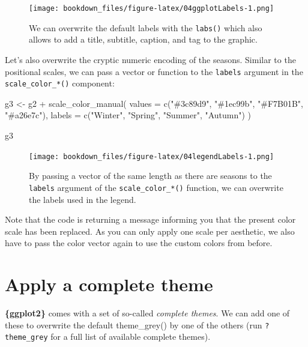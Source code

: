 \documentclass[
]{krantz}
\makeatletter
\newenvironment{Shaded}{\begin{snugshade}}{\end{snugshade}}
\newcommand{\AttributeTok}[1]{\textcolor[rgb]{0.61,0.61,0.61}{#1}}
\newcommand{\FunctionTok}[1]{\textcolor[rgb]{0,0,0}{#1}}
\newcommand{\NormalTok}[1]{#1}
\newcommand{\OtherTok}[1]{\textcolor[rgb]{0.37,0.37,0.37}{#1}}
\newcommand{\SpecialCharTok}[1]{\textcolor[rgb]{0,0,0}{#1}}
\newcommand{\StringTok}[1]{\textcolor[rgb]{0.5,0.5,0.5}{#1}}
\newenvironment{kframe}{%
\medskip{}
\setlength{\fboxsep}{.8em}
 \def\at@end@of@kframe{}%
 \ifinner\ifhmode%
  \def\at@end@of@kframe{\end{minipage}}%
  \begin{minipage}{\columnwidth}%
 \fi\fi%
 \def\FrameCommand##1{\hskip\@totalleftmargin \hskip-\fboxsep
 \colorbox{shadecolor}{##1}\hskip-\fboxsep
     \hskip-\linewidth \hskip-\@totalleftmargin \hskip\columnwidth}%
 \MakeFramed {\advance\hsize-\width
   \@totalleftmargin\z@ \linewidth\hsize
   \@setminipage}}%
 {\par\unskip\endMakeFramed%
 \at@end@of@kframe}
\renewenvironment{Shaded}{\begin{kframe}}{\end{kframe}}
\makeatother
\begin{document}
\begin{figure}
\centering
\texttt{[image: bookdown\_files/figure-latex/04ggplotLabels-1.png]}
\caption{\label{fig:04ggplotLabels}We can overwrite the default labels with the \texttt{labs()} which also allows to add a title, subtitle, caption, and tag to the graphic.}
\end{figure}

Let's also overwrite the cryptic numeric encoding of the seasons. Similar to the positional scales, we can pass a vector or function to the \texttt{labels} argument in the \texttt{scale\_color\_*()} component:

\begin{Shaded}
\begin{Highlighting}[]
\NormalTok{g3 }\OtherTok{\textless{}{-}}\NormalTok{ g2 }\SpecialCharTok{+}
  \FunctionTok{scale\_color\_manual}\NormalTok{(}
    \AttributeTok{values =} \FunctionTok{c}\NormalTok{(}\StringTok{"\#3c89d9"}\NormalTok{, }\StringTok{"\#1ec99b"}\NormalTok{, }\StringTok{"\#F7B01B"}\NormalTok{, }\StringTok{"\#a26e7c"}\NormalTok{),}
    \AttributeTok{labels =} \FunctionTok{c}\NormalTok{(}\StringTok{"Winter"}\NormalTok{, }\StringTok{"Spring"}\NormalTok{, }\StringTok{"Summer"}\NormalTok{, }\StringTok{"Autumn"}\NormalTok{)}
\NormalTok{  )}

\NormalTok{g3}
\end{Highlighting}
\end{Shaded}

\begin{figure}
\centering
\texttt{[image: bookdown\_files/figure-latex/04legendLabels-1.png]}
\caption{\label{fig:04legendLabels}By passing a vector of the same length as there are seasons to the \texttt{labels} argument of the \texttt{scale\_color\_*()} function, we can overwrite the labels used in the legend.}
\end{figure}

Note that the code is returning a message informing you that the present color scale has been replaced. As you can only apply one scale per aesthetic, we also have to pass the color vector again to use the custom colors from before.

\hypertarget{complete-themes}{%
\section{Apply a complete theme}\label{complete-themes}}

\textbf{\{ggplot2\}} comes with a set of so-called \emph{complete themes}. We can add one of these to overwrite the default theme\_grey() by one of the others (run \texttt{?theme\_grey} for a full list of available complete themes).
\end{document}
